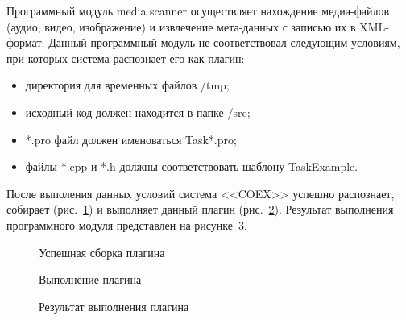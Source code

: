 Программный модуль media scanner осуществляет нахождение медиа-файлов (аудио, видео, изображение) и извлечение мета-данных с записью их в XML-формат. Данный программный модуль не соответствовал следующим условиям, при которых система распознает его как плагин:
\begin{itemize}
  \item директория для временных файлов /tmp;
  \item исходный код должен находится в папке /src;
  \item *.pro файл должен именоваться Task*.pro;
  \item файлы *.cpp и *.h должны соответствовать шаблону TaskExample.
\end{itemize}

После выполения данных условий система <<COEX>> успешно распознает, собирает (рис.~\ref{ship_6:ship_6}) и выполняет данный плагин (рис.~\ref{ship_7:ship_7}). Результат выполнения программного модуля представлен на рисунке~\ref{ship_8:ship_8}.

\begin{figure}[h!]
\caption{ Успешная сборка плагина }
\label{ship_6:ship_6}
\end{figure}

\begin{figure}[h!]
\caption{ Выполнение плагина }
\label{ship_7:ship_7}
\end{figure}

\begin{figure}[h!]
\caption{ Результат выполнения плагина }
\label{ship_8:ship_8}
\end{figure}

\clearpage
